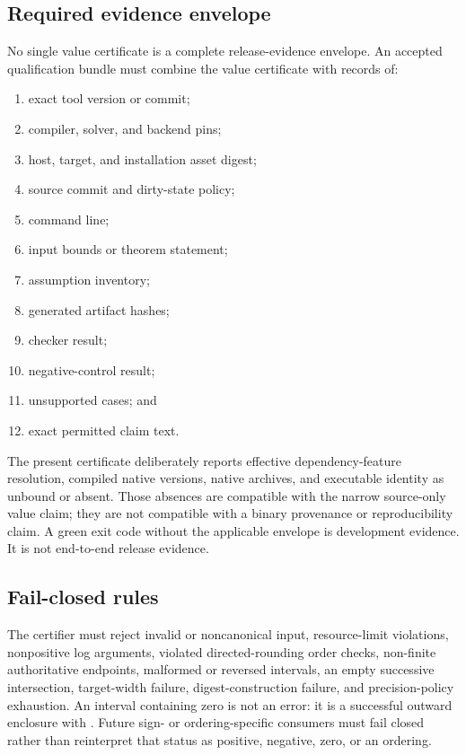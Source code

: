 \documentclass[11pt]{article}
\begin{document}
\subsection{Required evidence envelope}

No single value certificate is a complete release-evidence envelope.  An accepted qualification
bundle must combine the value certificate with records of:
\begin{enumerate}[leftmargin=*]
  \item exact tool version or commit;
  \item compiler, solver, and backend pins;
  \item host, target, and installation asset digest;
  \item source commit and dirty-state policy;
  \item command line;
  \item input bounds or theorem statement;
  \item assumption inventory;
  \item generated artifact hashes;
  \item checker result;
  \item negative-control result;
  \item unsupported cases; and
  \item exact permitted claim text.
\end{enumerate}

The present certificate deliberately reports effective dependency-feature resolution, compiled
native versions, native archives, and executable identity as unbound or absent.  Those absences are
compatible with the narrow source-only value claim; they are not compatible with a binary
provenance or reproducibility claim.  A green exit code without the applicable envelope is
development evidence.  It is not end-to-end release evidence.

\subsection{Fail-closed rules}

The certifier must reject invalid or noncanonical input, resource-limit violations, nonpositive log
arguments, violated directed-rounding order checks, non-finite authoritative endpoints, malformed
or reversed intervals, an empty successive intersection, target-width failure, digest-construction
failure, and precision-policy exhaustion.  An interval containing zero is not an error: it is a
successful outward enclosure with .  Future sign- or ordering-specific
consumers must fail closed rather than reinterpret that status as positive, negative, zero, or an
ordering.
\end{document}
